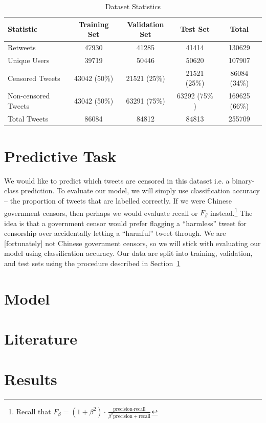 \documentclass{sig-alternate-05-2015}
\begin{document}
\begin{table}
  \centering
  \begin{tabular}{|l|c|c|c|c|}
    \hline
    Statistic & Training Set & Validation Set & Test Set & Total \\
    \hline
    Retweets & 47930 & 41285 & 41414 & 130629 \\
    Unique Users & 39719 & 50446 & 50620 & 107907 \\
    \hline
    Censored Tweets & 43042 (50\%) & 21521 (25\%) & 21521 (25\%) & 86084 (34\%)  \\
    Non-censored Tweets & 43042 (50\%) & 63291 (75\%) & 63292 (75\% )& 169625 (66\%) \\
    Total Tweets & 86084 & 84812 & 84813 & 255709 \\
    \hline
  \end{tabular}
  \caption{Dataset Statistics}
  \label{tab:descript}
\end{table}

\section{Predictive Task} \label{sec:pred}
We would like to predict which tweets are censored in this dataset i.e. a binary-class prediction. To evaluate our model, we will simply use classification accuracy -- the proportion of tweets that are labelled correctly. If we were Chinese government censors, then perhaps we would evaluate recall or $F_\beta$ instead.\footnote{Recall that $F_\beta = (1+\beta^2) \cdot \frac{\text{precision} \cdot \text{recall}}{\beta^2 \text{precision} + \text{recall}}$} The idea is that a government censor would prefer flagging a ``harmless'' tweet for censorship over accidentally letting a ``harmful'' tweet through. We are [fortunately] not Chinese government censors, so we will stick with evaluating our model using classification accuracy. Our data are split into training, validation, and test sets using the procedure described in Section~\ref{sec:pred}



\section{Model}

\section{Literature}

\section{Results}



\end{document}
